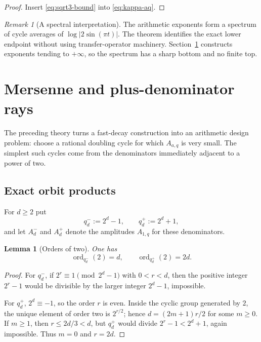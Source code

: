 \documentclass[11pt,oneside]{article}
\newtheorem{lemma}[theorem]{Lemma}
\theoremstyle{definition}
\theoremstyle{remark}
\newtheorem{remark}[theorem]{Remark}
\newcommand{\ord}{\operatorname{ord}}
\begin{document}
\begin{proof}
Insert \eqref{eq:sqrt3-bound} into \eqref{eq:kappa-aq}.
\end{proof}

\begin{remark}[A spectral interpretation]
The arithmetic exponents form a spectrum of cycle averages of
$\log|2\sin(\pi t)|$. The theorem identifies the exact lower endpoint without
using transfer-operator machinery. Section~\ref{sec:mersenne} constructs exponents
tending to $+\infty$, so the spectrum has a sharp bottom and no finite top.
\end{remark}

\section{Mersenne and plus-denominator rays}\label{sec:mersenne}

The preceding theory turns a fast-decay construction into an arithmetic design
problem: choose a rational doubling cycle for which $A_{a,q}$ is very small. The
simplest such cycles come from the denominators immediately adjacent to a power of
two.

\subsection{Exact orbit products}

For $d\ge2$ put
\begin{equation}
 q_d^-:=2^d-1,
 \qquad q_d^+:=2^d+1,
 \label{eq:qpm}
\end{equation}
and let $A_d^-$ and $A_d^+$ denote the amplitudes $A_{1,q}$ for these denominators.

\begin{lemma}[Orders of two]\label{lem:orders-pm}
One has
\begin{equation}
 \ord_{q_d^-}(2)=d,
 \qquad
 \ord_{q_d^+}(2)=2d.
 \label{eq:orders-pm}
\end{equation}
\end{lemma}

\begin{proof}
For $q_d^-$, if $2^r\equiv1\pmod{2^d-1}$ with $0<r<d$, then the positive integer
$2^r-1$ would be divisible by the larger integer $2^d-1$, impossible.

For $q_d^+$, $2^d\equiv-1$, so the order $r$ is even. Inside the cyclic group
generated by $2$, the unique element of order two is $2^{r/2}$; hence
$d=(2m+1)r/2$ for some $m\ge0$. If $m\ge1$, then $r\le2d/3<d$, but
$q_d^+$ would divide $2^r-1<2^d+1$, again impossible. Thus $m=0$ and $r=2d$.
\end{proof}
\end{document}
